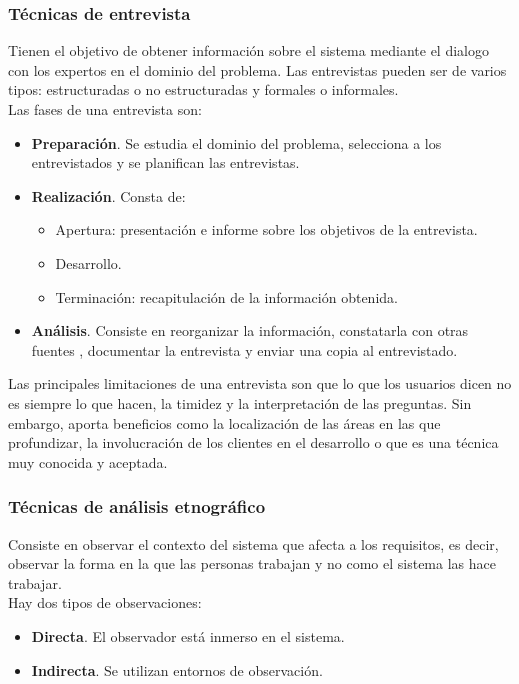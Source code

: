 \documentclass[12pt,spanish]{article}
\begin{document}
\subsubsection{Técnicas de entrevista}

Tienen el objetivo de obtener información sobre el sistema mediante el dialogo con los expertos en el dominio del problema. Las entrevistas pueden ser de varios tipos: estructuradas o no estructuradas y formales o informales.\\
Las fases de una entrevista son:
\begin{itemize}
	\item \textbf{Preparación}. Se estudia el dominio del problema, selecciona a los entrevistados y se planifican las entrevistas.
	\item \textbf{Realización}. Consta de:
		\begin{itemize}
			\item Apertura: presentación e informe sobre los objetivos de la entrevista.
			\item Desarrollo.
			\item Terminación: recapitulación de la información obtenida.

		\end{itemize}
	\item \textbf{Análisis}. Consiste en reorganizar la información, constatarla con otras fuentes , documentar la entrevista y enviar una copia al entrevistado.
\end{itemize}

Las principales limitaciones de una entrevista son que lo que los usuarios dicen no es siempre lo que hacen, la timidez y la interpretación de las preguntas. Sin embargo, aporta beneficios como la localización de las áreas en las que profundizar, la involucración de los clientes en el desarrollo o que es una técnica muy conocida y aceptada.

\subsubsection{Técnicas de análisis etnográfico}

Consiste en observar el contexto del sistema que afecta a los requisitos, es decir, observar la forma en la que las personas trabajan y no como el sistema las hace trabajar. 
\\
Hay dos tipos de observaciones: 
\begin{itemize}
	\item \textbf{Directa}. El observador está inmerso en el sistema.
	\item \textbf{Indirecta}. Se utilizan entornos de observación.
\end{itemize}
\end{document}
